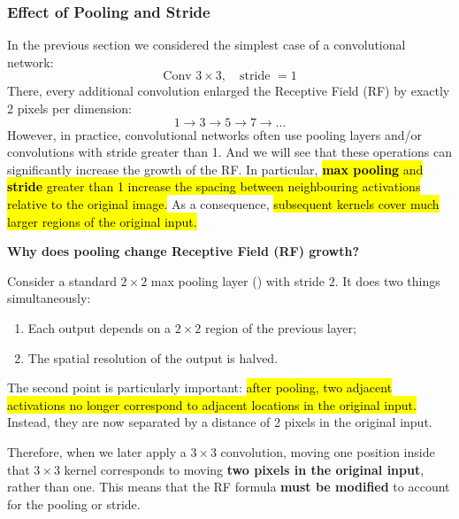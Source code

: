 \subsubsection{Effect of Pooling and Stride}\label{sec:effect-of-pooling-and-stride}

In the previous section we considered the simplest case of a convolutional network:
\begin{equation*}
    \text{Conv } 3 \times 3, \quad \text{stride } = 1
\end{equation*}
There, every additional convolution enlarged the Receptive Field (RF) by exactly 2 pixels per dimension:
\begin{equation*}
    1 \to 3 \to 5 \to 7 \to \dots
\end{equation*}
However, in practice, convolutional networks often use pooling layers and/or convolutions with stride greater than 1. And we will see that these operations can significantly increase the growth of the RF. In particular, \hl{\textbf{max pooling} and \textbf{stride} greater than 1 increase the spacing between neighbouring activations relative to the original image.} As a consequence, \hl{subsequent kernels cover much larger regions of the original input.}

\highspace
\begin{flushleft}
    \textcolor{Green3}{ \textbf{Why does pooling change Receptive Field (RF) growth?}}
\end{flushleft}
Consider a standard $2 \times 2$ max pooling layer () with stride $2$. It does two things simultaneously:
\begin{enumerate}
    \item Each output depends on a $2 \times 2$ region of the previous layer;
    \item The spatial resolution of the output is halved.
\end{enumerate}
The second point is particularly important: \hl{after pooling, two adjacent activations no longer correspond to adjacent locations in the original input.} Instead, they are now separated by a distance of 2 pixels in the original input.

\highspace
Therefore, when we later apply a $3 \times 3$ convolution, moving one position inside that $3 \times 3$ kernel corresponds to moving \textbf{two pixels in the original input}, rather than one. This means that the RF formula \textbf{must be modified} to account for the pooling or stride.

